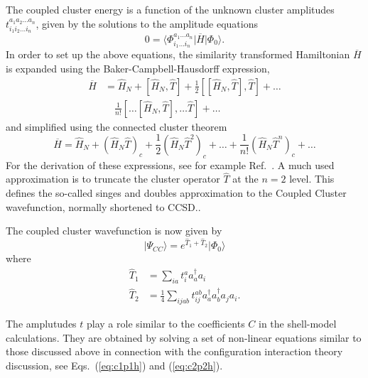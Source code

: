       The coupled cluster energy is a function of the unknown cluster
      amplitudes $t_{i_1i_2\ldots i_n}^{a_1a_2\ldots a_n}$, given by
      the solutions to the amplitude equations
      \begin{equation}
          0 = \langle\Phi_{i_1 \ldots i_n}^{a_1 \ldots a_n}\vert
          \overline{H}\vert \Phi_0\rangle.
      \end{equation}
In order to set up the above equations, 
the similarity transformed Hamiltonian $\overline{H}$ is expanded
  using the Baker-Campbell-Hausdorff expression,
      \begin{align}
          \overline{H}&= \hat{H}_N + \left[ \hat{H}_N, \hat{T} \right]
          + \frac{1}{2} \left[\left[ \hat{H}_N, \hat{T} \right],
            \hat{T}\right] + \ldots \\ & \quad \frac{1}{n!} \left[
            \ldots \left[ \hat{H}_N, \hat{T} \right], \ldots \hat{T}
            \right] +\dots
      \end{align}
  and simplified using the connected cluster theorem
      \begin{equation}
          \overline{H}= \hat{H}_N + \left( \hat{H}_N \hat{T}\right)_c
          + \frac{1}{2} \left( \hat{H}_N \hat{T}^2\right)_c + \dots +
          \frac{1}{n!} \left( \hat{H}_N \hat{T}^n\right)_c +\dots
      \end{equation}
For the derivation of these expressions, see for example Ref.~\cite{shavittbartlett2009}.
A much used approximation is to truncate the cluster operator
$\hat{T}$ at the $n=2$ level. This defines the so-called singes and
doubles approximation to the Coupled Cluster wavefunction, normally
shortened to CCSD..

  The coupled cluster wavefunction is now given by
  \begin{equation}
              \vert \Psi_{CC}\rangle = e^{\hat{T}_1 + \hat{T}_2} \vert
              \Phi_0\rangle
  \end{equation}
  where
          \begin{align*}
              \hat{T}_1 &= \sum_{ia} t_{i}^{a} a_{a}^\dagger a_i
              \\ \hat{T}_2 &= \frac{1}{4} \sum_{ijab} t_{ij}^{ab}
              a_{a}^\dagger a_{b}^\dagger a_{j} a_{i}.
          \end{align*}

  The amplutudes $t$ play a role similar to the coefficients $C$ in
  the shell-model calculations. They are obtained by solving a set of
  non-linear equations similar to those discussed above in connection
  with the configuration interaction theory  discussion, see Eqs.~(\ref{eq:c1p1h}) and (\ref{eq:c2p2h}). 

